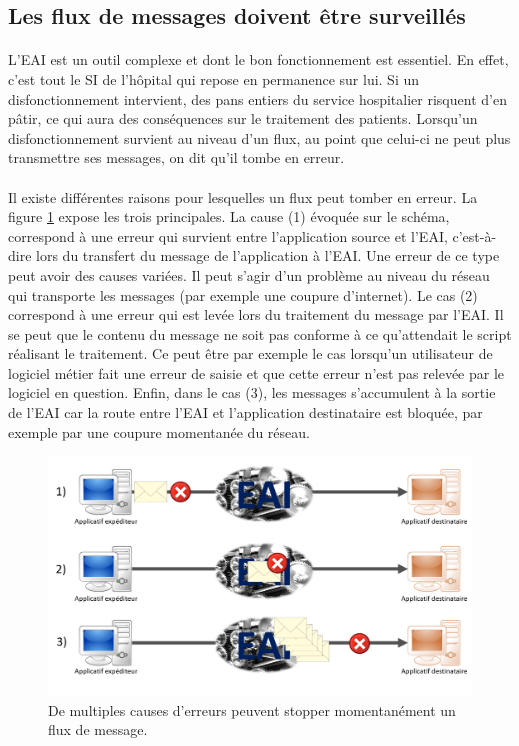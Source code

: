 		\subsection{Les flux de messages doivent être surveillés}
			\paragraph{}%
			L'EAI est un outil complexe et dont le bon fonctionnement est essentiel. En
			effet, c'est tout le SI de l'hôpital qui repose en permanence sur lui. Si
			un disfonctionnement intervient, des pans entiers du
			service hospitalier risquent d'en pâtir, ce qui aura des conséquences sur le
			traitement des patients. Lorsqu'un disfonctionnement survient au niveau d'un
			flux, au point que celui-ci ne peut plus transmettre ses messages, on dit
			qu'il tombe en erreur.

			\paragraph{}%
			Il existe différentes raisons pour lesquelles un flux peut tomber en erreur.
			La figure \ref{interop_erreur} expose les trois principales. La cause (1)
			évoquée sur le schéma, correspond à une erreur qui survient entre l'application source et l'EAI,
			c'est-à-dire lors du transfert du message de l'application à l'EAI. Une
			erreur de ce type peut avoir des causes variées. Il peut s'agir d'un problème
			au niveau du réseau qui transporte les messages (par exemple une coupure
			d'internet). Le cas (2) correspond à une erreur qui est levée
			lors du traitement du message par l'EAI. Il se peut que le contenu du
			message ne soit pas conforme à ce qu'attendait le script réalisant le
			traitement. Ce peut être par exemple le cas lorsqu'un utilisateur de
			logiciel métier fait une erreur de saisie et que cette erreur n'est pas
			relevée par le logiciel en question. Enfin, dans le cas (3), les messages
			s'accumulent à la sortie de l'EAI car la route entre l'EAI et l'application
			destinataire est bloquée, par exemple par une coupure momentanée du réseau.
			\newline
			\begin{figure}[H]
				\centering
				\includegraphics[width=15cm]{../img/error_1.png}
				\caption{\label{interop_erreur} De multiples causes d'erreurs peuvent
				stopper momentanément un flux de message.}
			\end{figure}
			
